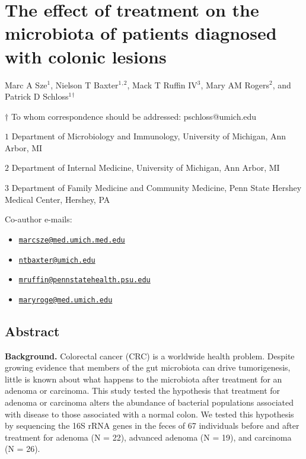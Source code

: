 \documentclass[12pt,]{article}
\title{}
\author{}
\date{}
\providecommand{\tightlist}{%
  \setlength{\itemsep}{0pt}\setlength{\parskip}{0pt}}
\begin{document}
\section{The effect of treatment on the microbiota of patients diagnosed
with colonic
lesions}\label{the-effect-of-treatment-on-the-microbiota-of-patients-diagnosed-with-colonic-lesions}

\begin{center}
\vspace{25mm}

Marc A Sze${^1}$, Nielson T Baxter${^1}$${^,}$${^2}$, Mack T Ruffin IV${^3}$, Mary AM Rogers${^2}$, and Patrick D Schloss${^1}$${^\dagger}$

\vspace{20mm}

$\dagger$ To whom correspondence should be addressed: pschloss@umich.edu

$1$ Department of Microbiology and Immunology, University of Michigan, Ann Arbor, MI

$2$ Department of Internal Medicine, University of Michigan, Ann Arbor, MI

$3$ Department of Family Medicine and Community Medicine, Penn State Hershey Medical Center, Hershey, PA


\end{center}

Co-author e-mails:

\begin{itemize}
\tightlist
\item
  \href{mailto:marcsze@med.umich.med.edu}{\nolinkurl{marcsze@med.umich.med.edu}}
\item
  \href{mailto:ntbaxter@umich.edu}{\nolinkurl{ntbaxter@umich.edu}}
\item
  \href{mailto:mruffin@pennstatehealth.psu.edu}{\nolinkurl{mruffin@pennstatehealth.psu.edu}}
\item
  \href{mailto:maryroge@med.umich.edu}{\nolinkurl{maryroge@med.umich.edu}}
\end{itemize}

\newpage

\linenumbers

\subsection{Abstract}\label{abstract}

\textbf{Background.} Colorectal cancer (CRC) is a worldwide health
problem. Despite growing evidence that members of the gut microbiota can
drive tumorigenesis, little is known about what happens to the
microbiota after treatment for an adenoma or carcinoma. This study
tested the hypothesis that treatment for adenoma or carcinoma alters the
abundance of bacterial populations associated with disease to those
associated with a normal colon. We tested this hypothesis by sequencing
the 16S rRNA genes in the feces of 67 individuals before and after
treatment for adenoma (N = 22), advanced adenoma (N = 19), and carcinoma
(N = 26).
\end{document}
